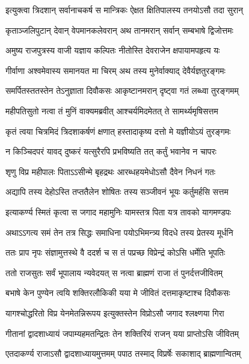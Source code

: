 \twolineshloka
{इत्युक्त्वा त्रिदशान् सर्वानाचकर्ष स मान्त्रिकः}
{ऐक्षत क्षितिपालस्य तनयोऽसौ तदा सुरान्} %

\twolineshloka
{कृताञ्जलिपुटान् देवान् वेपमानकलेवरान्}
{अथ तानमरान् सर्वान् सम्बभाषे द्विजोत्तमः} %

\twolineshloka
{अमुष्य राजपुत्रस्य वाजी यज्ञाय कल्पितः}
{नीतोस्ति देवराजेन क्षपायामपहृत्य यः} %

\twolineshloka
{गीर्वाणा अश्वमेवास्य समानयत मा चिरम्}
{अथ तस्य मुनेर्वाक्याद् देवैर्यज्ञतुरङ्गमः} %

\twolineshloka
{समर्पितस्ततस्तेन तेऽनुज्ञाता दिवौकसः}
{आकृष्टानमरान् दृष्ट्वा गतं लब्ध्वा तुरङ्गमम्} %

\twolineshloka
{महीपतिसुतो नत्वा तं मुनिं वाक्यमब्रवीत्}
{आश्चर्यमिदमेतत् ते सामर्थ्यमृषिसत्तम} %

\twolineshloka
{कृतं त्वया चित्रमिदं त्रिदशाकर्षणं क्षणात्}
{हस्तादाकृष्य दत्तो मे यज्ञीयोऽयं तुरङ्गमः} %

\twolineshloka
{न किञ्चिदपरं यावद् दुष्करं यत्सुरैरपि}
{प्रभविष्यति तत् कर्तुं भवानेव न चापरः} %

\twolineshloka
{शृणु विप्र महीपालः पिताऽऽसीन्मे बृहद्रथः}
{आरब्धहयमेधोऽसौ दैवेन निधनं गतः} %

\twolineshloka
{अद्यापि तस्य देहोऽस्ति तप्ततैलेन शोषितः}
{तस्य सञ्जीवनं भूयः कर्तुमर्हसि सत्तम} %

\twolineshloka
{इत्याकर्ण्य स्मितं कृत्वा स जगाद महामुनिः}
{यामस्तत्र पिता यत्र तावको यागमण्डपः} %

\twolineshloka
{अथाऽऽगत्य समं तेन तत्र सिद्धः समाधिना}
{पयोऽभिमन्त्र्य विदधे तस्य प्रेतस्य मूर्धनि} %

\twolineshloka
{ततः प्राप नृपः संज्ञामुत्तस्थे वै ददर्श च}
{स तं पप्रच्छ विप्रेन्द्रं कोऽसि धर्मेति भूपतिः} %

\twolineshloka
{ततो राजसुतः सर्वं भूपालाय न्यवेदयत्}
{स नत्वा ब्राह्मणं राजा तं पुनर्दत्तजीवितम्} %

\twolineshloka
{बभाषे केन पुण्येन त्वयि शक्तिरलौकिकी}
{यया मे जीवितं दत्तमाकृष्टाश्च दिवौकसः} %

\twolineshloka
{यागश्चोद्धरितो विप्र येनमेतन्निरूपय}
{इत्युक्तस्तेन विप्रोऽसौ जगाद श्लक्ष्णया गिरा} %

\twolineshloka
{गीतानां द्वादशाध्यायं जपाम्यहमतन्द्रितः}
{तेन शक्तिरियं राजन् यया प्राप्तोऽसि जीवितम्} %

\twolineshloka
{एतदाकर्ण्य राजाऽसौ द्वादशाध्यायमुत्तमम्}
{पपाठ तस्माद् विप्रर्षेः सकाशाद् ब्राह्मणान्वितम्} %

